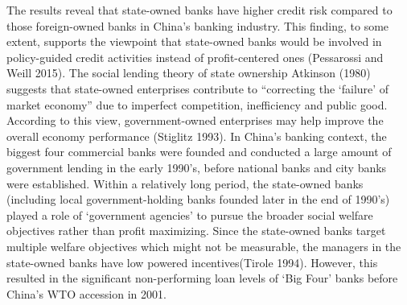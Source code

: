 \documentclass{article}
\begin{document}
The results reveal that state-owned banks have higher credit risk
compared to those foreign-owned banks in China's banking industry. This
finding, to some extent, supports the viewpoint that state-owned banks
would be involved in policy-guided credit activities instead of
profit-centered ones (Pessarossi and Weill 2015). The social lending
theory of state ownership Atkinson (1980) suggests that state-owned
enterprises contribute to ``correcting the `failure' of market economy''
due to imperfect competition, inefficiency and public good. According to
this view, government-owned enterprises may help improve the overall
economy performance (Stiglitz 1993). In China's banking context, the
biggest four commercial banks were founded and conducted a large amount
of government lending in the early 1990's, before national banks and
city banks were established. Within a relatively long period, the
state-owned banks (including local government-holding banks founded
later in the end of 1990's) played a role of `government agencies' to
pursue the broader social welfare objectives rather than profit
maximizing. Since the state-owned banks target multiple welfare
objectives which might not be measurable, the managers in the
state-owned banks have low powered incentives(Tirole 1994). However,
this resulted in the significant non-performing loan levels of `Big
Four' banks before China's WTO accession in 2001.
\end{document}
